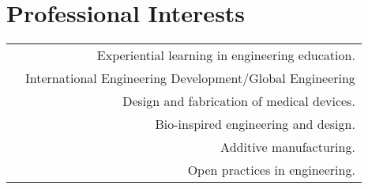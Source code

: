 \section*{Professional Interests}
\begin{tabular}{L!{\VRule}R}
&Experiential learning in engineering education.\\
&International Engineering Development/Global Engineering\\
&Design and fabrication of medical devices.\\
&Bio-inspired engineering and design.\\
&Additive manufacturing.\\
&Open practices in engineering.\\
\end{tabular}